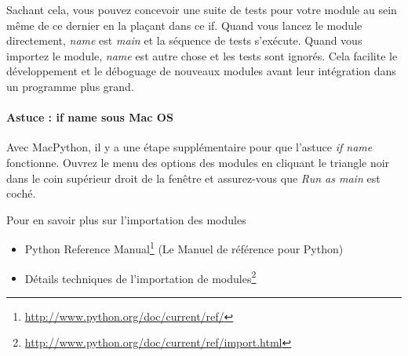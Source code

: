 Sachant cela, vous pouvez concevoir une suite de tests pour votre module au sein même de ce dernier en la plaçant dans ce if. Quand vous lancez le module directement, \emph{name} est \emph{main} et la séquence de tests s'exécute. Quand vous importez le module, \emph{name} est autre chose et les tests sont ignorés. Cela facilite le développement et le déboguage de nouveaux modules avant leur intégration dans un programme plus grand.

\paragraph*{Astuce : if name sous Mac OS}
Avec MacPython, il y a une étape supplémentaire pour que l'astuce \emph{if name} fonctionne. Ouvrez le menu des options des modules en cliquant le triangle noir dans le coin supérieur droit de la fenêtre et assurez-vous que \emph{Run as main} est coché.

\medskip
\noindent Pour en savoir plus sur l'importation des modules

\begin{itemize}
    \item{Python Reference Manual\footnote{\url{http://www.python.org/doc/current/ref/}} (Le Manuel de référence pour Python)}
    \item{Détails techniques de l'importation de modules\footnote{\url{http://www.python.org/doc/current/ref/import.html}}}
\end{itemize}
